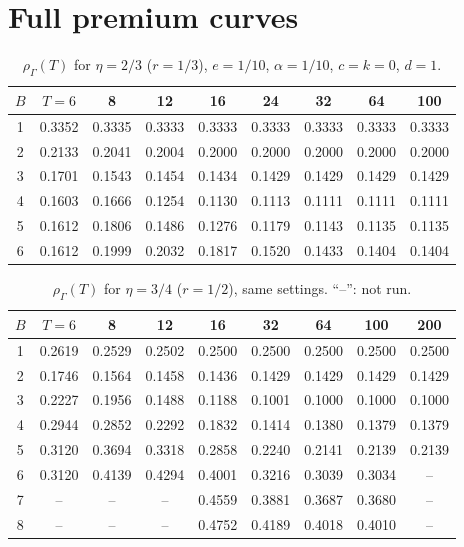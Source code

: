 \documentclass{article}
\theoremstyle{plain}
\theoremstyle{definition}
\theoremstyle{remark}
\newcommand{\rhoG}{\rho_\Gamma}
\begin{document}


\section{Full premium curves}
\label{app:curves}

\begin{table}[h]
\centering
\caption{$\rhoG(T)$ for $\eta=2/3$ ($r=1/3$), $e=1/10$, $\alpha=1/10$, $c=k=0$, $d=1$.}
\small
\begin{tabular}{ccccccccc}
\toprule
$B$ & $T=6$ & 8 & 12 & 16 & 24 & 32 & 64 & 100\\
\midrule
1 & 0.3352 & 0.3335 & 0.3333 & 0.3333 & 0.3333 & 0.3333 & 0.3333 & 0.3333\\
2 & 0.2133 & 0.2041 & 0.2004 & 0.2000 & 0.2000 & 0.2000 & 0.2000 & 0.2000\\
3 & 0.1701 & 0.1543 & 0.1454 & 0.1434 & 0.1429 & 0.1429 & 0.1429 & 0.1429\\
4 & 0.1603 & 0.1666 & 0.1254 & 0.1130 & 0.1113 & 0.1111 & 0.1111 & 0.1111\\
5 & 0.1612 & 0.1806 & 0.1486 & 0.1276 & 0.1179 & 0.1143 & 0.1135 & 0.1135\\
6 & 0.1612 & 0.1999 & 0.2032 & 0.1817 & 0.1520 & 0.1433 & 0.1404 & 0.1404\\
\bottomrule
\end{tabular}
\end{table}

\begin{table}[h]
\centering
\caption{$\rhoG(T)$ for $\eta=3/4$ ($r=1/2$), same settings. ``--'': not run.}
\small
\begin{tabular}{ccccccccc}
\toprule
$B$ & $T=6$ & 8 & 12 & 16 & 32 & 64 & 100 & 200\\
\midrule
1 & 0.2619 & 0.2529 & 0.2502 & 0.2500 & 0.2500 & 0.2500 & 0.2500 & 0.2500\\
2 & 0.1746 & 0.1564 & 0.1458 & 0.1436 & 0.1429 & 0.1429 & 0.1429 & 0.1429\\
3 & 0.2227 & 0.1956 & 0.1488 & 0.1188 & 0.1001 & 0.1000 & 0.1000 & 0.1000\\
4 & 0.2944 & 0.2852 & 0.2292 & 0.1832 & 0.1414 & 0.1380 & 0.1379 & 0.1379\\
5 & 0.3120 & 0.3694 & 0.3318 & 0.2858 & 0.2240 & 0.2141 & 0.2139 & 0.2139\\
6 & 0.3120 & 0.4139 & 0.4294 & 0.4001 & 0.3216 & 0.3039 & 0.3034 & --\\
7 & -- & -- & -- & 0.4559 & 0.3881 & 0.3687 & 0.3680 & --\\
8 & -- & -- & -- & 0.4752 & 0.4189 & 0.4018 & 0.4010 & --\\
\bottomrule
\end{tabular}
\end{table}
\end{document}
